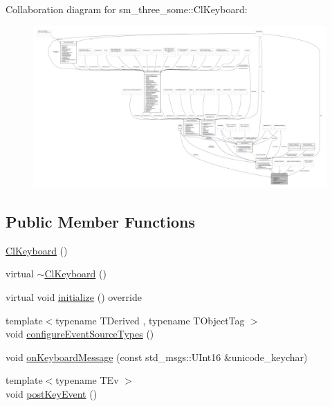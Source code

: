 Collaboration diagram for sm\+\_\+three\+\_\+some\+:\+:Cl\+Keyboard\+:
\nopagebreak
\begin{figure}[H]
\begin{center}
\leavevmode
\includegraphics[width=350pt]{classsm__three__some_1_1ClKeyboard__coll__graph}
\end{center}
\end{figure}
\subsection*{Public Member Functions}
\begin{DoxyCompactItemize}
\item 
\hyperlink{classsm__three__some_1_1ClKeyboard_adf56f7d1cba8294c12cc711c1916496d}{Cl\+Keyboard} ()
\item 
virtual \hyperlink{classsm__three__some_1_1ClKeyboard_a08df3fe2752b6eee73899e511d7d888a}{$\sim$\+Cl\+Keyboard} ()
\item 
virtual void \hyperlink{classsm__three__some_1_1ClKeyboard_adbc06c9dc3a4a5b266ff70a4300dcdeb}{initialize} () override
\item 
{\footnotesize template$<$typename T\+Derived , typename T\+Object\+Tag $>$ }\\void \hyperlink{classsm__three__some_1_1ClKeyboard_a01fc3b9cb7b60b9e764dfa8debbd17ab}{configure\+Event\+Source\+Types} ()
\item 
void \hyperlink{classsm__three__some_1_1ClKeyboard_ad6f5619d4c4875a6d0dc8262ab49e10f}{on\+Keyboard\+Message} (const std\+\_\+msgs\+::\+U\+Int16 \&unicode\+\_\+keychar)
\item 
{\footnotesize template$<$typename T\+Ev $>$ }\\void \hyperlink{classsm__three__some_1_1ClKeyboard_a7e632c803df38eba991432752bcf7116}{post\+Key\+Event} ()
\end{DoxyCompactItemize}
